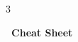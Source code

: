 \documentclass[10pt,landscape]{article}
\makeatletter
\renewcommand{\section}{\@startsection{section}{1}{0mm}%
                                {-1ex plus -.5ex minus -.2ex}%
                                {0.5ex plus .2ex}%
                                {\normalfont\large\bfseries}}
\renewcommand{\subsection}{\@startsection{subsection}{2}{0mm}%
                                {-1explus -.5ex minus -.2ex}%
                                {0.5ex plus .2ex}%
                                {\normalfont\normalsize\bfseries}}
\makeatother
\begin{document}
\raggedright
\footnotesize
\begin{multicols}{3}


\setlength{\premulticols}{1pt}
\setlength{\postmulticols}{1pt}
\setlength{\multicolsep}{1pt}
\setlength{\columnsep}{2pt}

\begin{center}
     \Large{\textbf{\LaTeXe\ Cheat Sheet}} \\
\end{center}

% 
% 
% 
\newlength{\MyLen}

\end{multicols}
\end{document}
